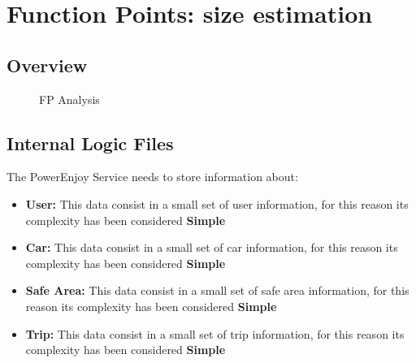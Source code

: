 
\section{Function Points: size estimation}
\subsection{Overview}



\begin{figure}[h]
	\centering
	\caption{FP Analysis}
\end{figure}
\FloatBarrier


\subsection{Internal Logic Files} %

The PowerEnjoy Service needs to store information about:

\begin{itemize}
	\item \textbf{User:} This data consist in a small set of user information, for this reason its complexity has been considered \textbf{Simple}
	\item \textbf{Car:} This data consist in a small set of car information, for this reason its complexity has been considered \textbf{Simple}
	\item \textbf{Safe Area:} This data consist in a small set of safe area information, for this reason its complexity has been considered \textbf{Simple}
	\item \textbf{Trip:} This data consist in a small set of trip information, for this reason its complexity has been considered \textbf{Simple}
\end{itemize}

